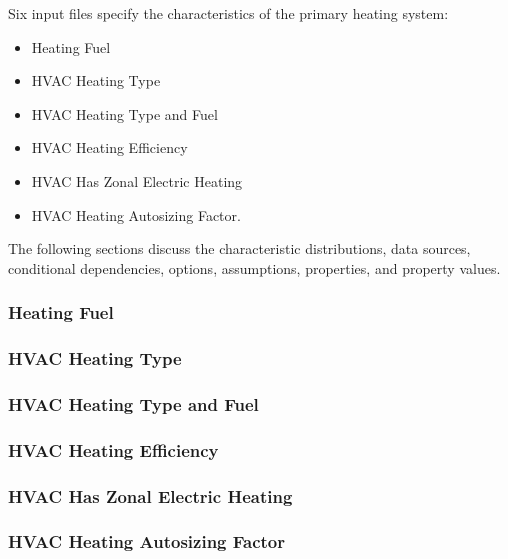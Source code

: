 Six input files specify the characteristics of the primary heating system:
\begin{itemize}
    \item Heating Fuel
    \item HVAC Heating Type
    \item HVAC Heating Type and Fuel
    \item HVAC Heating Efficiency
    \item HVAC Has Zonal Electric Heating
    \item HVAC Heating Autosizing Factor.
\end{itemize}

The following sections discuss the characteristic distributions, data sources, conditional dependencies, options, assumptions, properties, and property values.

\subsubsection{Heating Fuel}


\subsubsection{HVAC Heating Type}


\subsubsection{HVAC Heating Type and Fuel}


\subsubsection{HVAC Heating Efficiency}


\subsubsection{HVAC Has Zonal Electric Heating}


\subsubsection{HVAC Heating Autosizing Factor}


